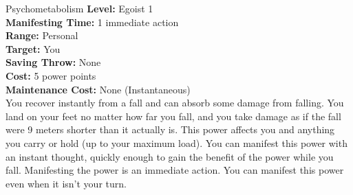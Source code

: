 {Psychometabolism}
{
	\textbf{Level:}
	Egoist 1\\
	\textbf{Manifesting Time:}
	1 immediate action\\
	\textbf{Range:}
	Personal\\
	\textbf{Target:}
	You\\
	\textbf{Saving Throw:}
	None\\
	\textbf{Cost:}
	5 power points\\
	\textbf{Maintenance Cost:}
	None (Instantaneous)\\
}
{
	You recover instantly from a fall and can absorb some damage from falling. You land on your feet no matter how far you fall, and you take damage as if the fall were 9 meters shorter than it actually is. This power affects you and anything you carry or hold (up to your maximum load). You can manifest this power with an instant thought, quickly enough to gain the benefit of the power while you fall. Manifesting the power is an immediate action. You can manifest this power even when it isn't your turn.
}